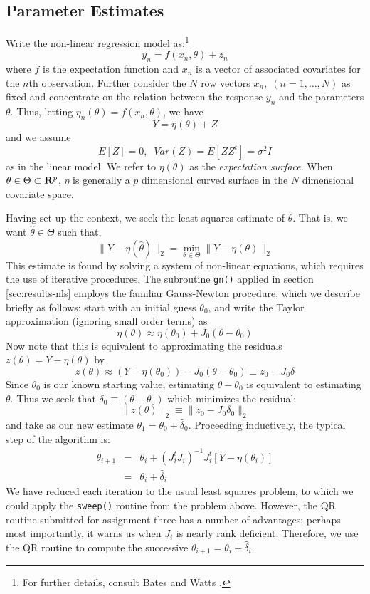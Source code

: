 \documentclass{article}
\begin{document}
\subsection{Parameter Estimates}
Write the non-linear regression model as:\footnote{For further
    details, consult Bates and Watts \cite{bates}.}
\[y_n = f(x_n,\theta) + z_n\]
where $f$ is the expectation function and $x_n$ is a vector of
associated covariates for the $n$th observation.  Further consider 
the $N$ row vectors $x_n, \; (n=1,\ldots,N)$ as fixed and concentrate
on the relation between the response $y_n$ and the parameters
$\theta$.  Thus, letting $\eta_n(\theta) = f(x_n,\theta)$, we have
\[Y = \eta(\theta) + Z \]
and we assume
\[E[Z] = 0, \;\;Var(Z) = E[ZZ^t] = \sigma^2 I\]
as in the linear model.  We refer to $\eta(\theta)$ as the 
\emph{expectation surface}.  When $\theta \in \Theta \subset {\bf
  R}^p$, $\eta$ is generally a $p$ dimensional curved surface in 
the $N$ dimensional covariate space.

Having set up the context, we seek the least squares estimate of
$\theta$.  That is, we want $\hat \theta \in \Theta$ such that,
\[\|Y - \eta(\hat \theta)\|_2 = \min_{\theta \in \Theta}
\|Y - \eta(\theta)\|_2\]
This estimate is found by solving a system of non-linear
equations, which requires the use of iterative procedures.  The
subroutine {\tt gn()} applied in section \ref{sec:results-nls} 
employs the familiar Gauss-Newton procedure, which we describe briefly
as follows:
start with an initial guess $\theta_0$, and write the Taylor
  approximation (ignoring small order terms) as 
\[\eta(\theta) \approx \eta(\theta_0) + J_0(\theta - \theta_0)\]
Now note that this is equivalent to approximating the 
residuals $z(\theta) = Y-\eta(\theta) $ by 
\[z(\theta) \approx (Y-\eta(\theta_0)) - J_0(\theta - \theta_0)
\equiv z_0 - J_0\delta\]
Since $\theta_0$ is our known starting value, estimating $\theta -
\theta_0$ is equivalent to estimating $\theta$.  Thus we seek that
$\delta_0 \equiv (\theta - \theta_0)$ which minimizes the residual:
\begin{equation}
\label{eqn:ls}
\|z(\theta)\|_2 \equiv \|z_0 - J_0\delta_0\|_2
\end{equation}
and take as our new estimate $\theta_1 = \theta_0 + \hat \delta_0$.
Proceeding inductively, the typical step of the algorithm is:
\begin{eqnarray*}
\theta_{i+1} & = & \theta_i 
+ (J_i^tJ_i)^{-1}J_i^t\left[Y - \eta(\theta_i)\right]\\
& = & \theta_i + \hat \delta_i
\end{eqnarray*}
We have reduced each iteration to the usual least squares problem, to
which we could apply the {\tt sweep()} routine from the problem above.
However, the QR routine submitted for assignment three has
a number of advantages; perhaps most importantly, 
it warns us when $J_i$ is nearly rank deficient.  Therefore,
we use the QR routine to compute the successive $\theta_{i+1} = \theta_i + \hat
\delta_i$.
\end{document}
